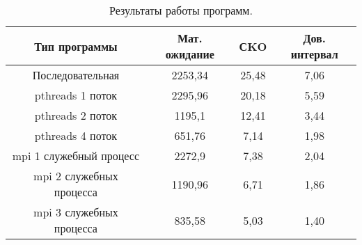 \documentclass[12pt,a4paper]{report}
\begin{document}
				\begin{table}[h]
					\caption{\label{tab:serial} Результаты работы программ.}
					\begin{center}
						\begin{tabular}{|c|c|c|c|}
							\hline
							\textbf{Тип программы} & \textbf{Мат. ожидание} & \textbf{СKO} & \textbf{Дов. интервал}\\
							\hline
							Последовательная & 2253,34 & 25,48 & 7,06\\
							\hline
							pthreads 1 поток & 2295,96 & 20,18 & 5,59\\
							\hline
							pthreads 2 поток & 1195,1 & 12,41 & 3,44\\
							\hline
							pthreads 4 поток & 651,76 & 7,14 & 1,98\\
							\hline
							mpi 1 служебный процесс & 2272,9 & 7,38 & 2,04\\
							\hline
							mpi 2 служебных процесса & 1190,96 & 6,71 & 1,86\\
							\hline
							mpi 3 служебных процесса & 835,58 & 5,03 & 1,40\\
							\hline
						\end{tabular}
					\end{center}
				\end{table} 
\end{document}
